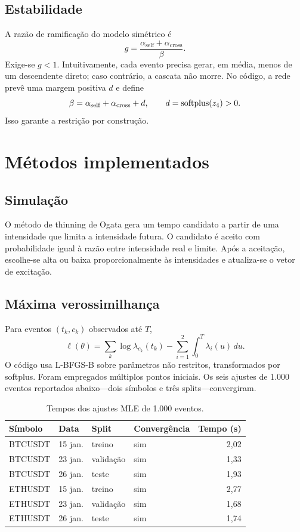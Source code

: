 \documentclass[12pt,a4paper]{report}
\begin{document}
\section{Estabilidade}

A razão de ramificação do modelo simétrico é
\[
  g=\frac{\alpha_{\mathrm{self}}+\alpha_{\mathrm{cross}}}{\beta}.
\]
Exige-se \(g<1\). Intuitivamente, cada evento precisa gerar, em média, menos de um
descendente direto; caso contrário, a cascata não morre. No código, a rede prevê uma
margem positiva \(d\) e define
\[
 \beta=\alpha_{\mathrm{self}}+\alpha_{\mathrm{cross}}+d,
 \qquad d=\operatorname{softplus}(z_4)>0.
\]
Isso garante a restrição por construção.

\chapter{Métodos implementados}

\section{Simulação}

O método de thinning de Ogata \citep{ogata1981} gera um tempo candidato a partir de uma
intensidade que limita a intensidade futura. O candidato é aceito com probabilidade
igual à razão entre intensidade real e limite. Após a aceitação, escolhe-se alta ou
baixa proporcionalmente às intensidades e atualiza-se o vetor de excitação.

\section{Máxima verossimilhança}

Para eventos \((t_k,c_k)\) observados até \(T\),
\[
 \ell(\theta)=\sum_k\log\lambda_{c_k}(t_k)
 -\sum_{i=1}^{2}\int_0^T\lambda_i(u)\,du.
\]
O código usa L-BFGS-B sobre parâmetros não restritos, transformados por softplus.
Foram empregados múltiplos pontos iniciais. Os seis ajustes de 1.000 eventos
reportados abaixo---dois símbolos e três splits---convergiram.

\begin{table}[ht]
\centering
\caption{Tempos dos ajustes MLE de 1.000 eventos.}
\begin{tabular}{llllr}
\toprule
Símbolo & Data & Split & Convergência & Tempo (s)\\
\midrule
BTCUSDT & 15 jan. & treino & sim & 2,02\\
BTCUSDT & 23 jan. & validação & sim & 1,33\\
BTCUSDT & 26 jan. & teste & sim & 1,93\\
ETHUSDT & 15 jan. & treino & sim & 2,77\\
ETHUSDT & 23 jan. & validação & sim & 1,68\\
ETHUSDT & 26 jan. & teste & sim & 1,74\\
\bottomrule
\end{tabular}
\end{table}
\end{document}
